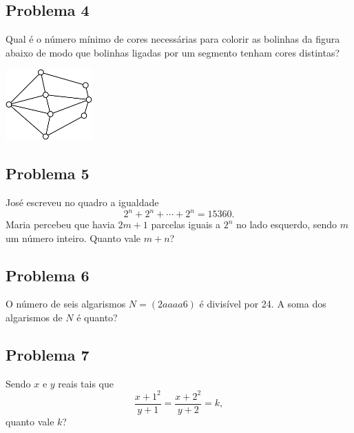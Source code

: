 \documentclass[12pt]{article}
\begin{document}
\subsection{Problema 4}
\begin{tcolorbox}[statementbox]
Qual é o número mínimo de cores necessárias para colorir as bolinhas da figura abaixo de modo que bolinhas ligadas por um
segmento tenham cores distintas?
\begin{center}
  \includegraphics[width=0.25\textwidth]{first.png}
\end{center}
\end{tcolorbox}

\clearpage

\subsection{Problema 5}
\begin{tcolorbox}[statementbox]
José escreveu no quadro a igualdade
\[
  2^n + 2^n + \cdots + 2^n = 15360.
\]
Maria percebeu que havia \(2m+1\) parcelas iguais a \(2^n\) no lado esquerdo, sendo \(m\) um número inteiro. Quanto vale \(m+n\)?
\end{tcolorbox}

\clearpage

\subsection{Problema 6}
\begin{tcolorbox}[statementbox]
O número de seis algarismos \(N = (2aaaa6)\) é divisível por 24. A soma dos algarismos de \(N\) é quanto?
\end{tcolorbox}

\clearpage

\subsection{Problema 7}
\begin{tcolorbox}[statementbox]
Sendo \(x\) e \(y\) reais tais que
\[
  \frac{x+1^2}{y + 1} = \frac{x+2^2}{y+2} = k,
\]
quanto vale \(k\)?
\end{tcolorbox}
\end{document}
